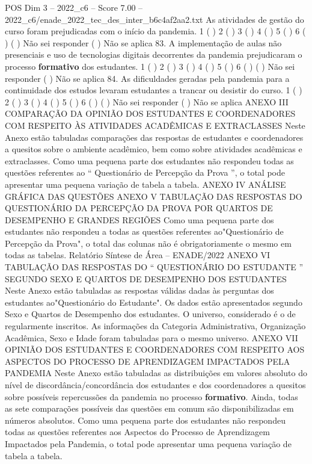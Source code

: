 \begin{textsample}{POS Dim 3 – 2022\_c6 – Score 7.00 – 2022\_c6/enade\_2022\_tec\_des\_inter\_b6c4af2aa2.txt}
As atividades de gestão do curso foram prejudicadas com o início da pandemia. 1 ( ) 2 ( ) 3 ( ) 4 ( ) 5 ( ) 6 ( ) ( ) Não sei responder ( ) Não se aplica 83.
A implementação de aulas não presenciais e uso de tecnologias digitais decorrentes da pandemia prejudicaram o processo \textbf{formativo} dos estudantes. 1 ( ) 2 ( ) 3 ( ) 4 ( ) 5 ( ) 6 ( ) ( ) Não sei responder ( ) Não se aplica 84.
As dificuldades geradas pela pandemia para a continuidade dos estudos levaram estudantes a trancar ou desistir do curso. 1 ( ) 2 ( ) 3 ( ) 4 ( ) 5 ( ) 6 ( ) ( ) Não sei responder ( ) Não se aplica ANEXO III COMPARAÇÃO DA OPINIÃO DOS ESTUDANTES E COORDENADORES COM RESPEITO ÀS ATIVIDADES ACADÊMICAS E EXTRACLASSES Neste Anexo estão tabuladas comparações das respostas de estudantes e coordenadores a quesitos sobre o ambiente acadêmico, bem como sobre atividades acadêmicas e extraclasses.
Como uma pequena parte dos estudantes não respondeu todas as questões referentes ao “ Questionário de Percepção da Prova ”, o total pode apresentar uma pequena variação de tabela a tabela.
ANEXO IV ANÁLISE GRÁFICA DAS QUESTÕES ANEXO V TABULAÇÃO DAS RESPOSTAS DO QUESTIONÁRIO DA PERCEPÇÃO DA PROVA POR QUARTOS DE DESEMPENHO E GRANDES REGIÕES Como uma pequena parte dos estudantes não respondeu a todas as questões referentes ao"Questionário de Percepção da Prova", o total das colunas não é obrigatoriamente o mesmo em todas as tabelas.
Relatório Síntese de Área – ENADE/2022 ANEXO VI TABULAÇÃO DAS RESPOSTAS DO “ QUESTIONÁRIO DO ESTUDANTE ” SEGUNDO SEXO E QUARTOS DE DESEMPENHO DOS ESTUDANTES Neste Anexo estão tabuladas as respostas válidas dadas às perguntas dos estudantes ao"Questionário do Estudante".
Os dados estão apresentados segundo Sexo e Quartos de Desempenho dos estudantes.
O universo, considerado é o de regularmente inscritos.
As informações da Categoria Administrativa, Organização Acadêmica, Sexo e Idade foram tabuladas para o mesmo universo.
ANEXO VII OPINIÃO DOS ESTUDANTES E COORDENADORES COM RESPEITO AOS ASPECTOS DO PROCESSO DE APRENDIZAGEM IMPACTADOS PELA PANDEMIA Neste Anexo estão tabuladas as distribuições em valores absoluto do nível de discordância/concordância dos estudantes e dos coordenadores a quesitos sobre possíveis repercussões da pandemia no processo \textbf{formativo}.
Ainda, todas as sete comparações possíveis das questões em comum são disponibilizadas em números absolutos.
Como uma pequena parte dos estudantes não respondeu todas as questões referentes aos Aspectos do Processo de Aprendizagem Impactados pela Pandemia, o total pode apresentar uma pequena variação de tabela a tabela.

\end{textsample}
